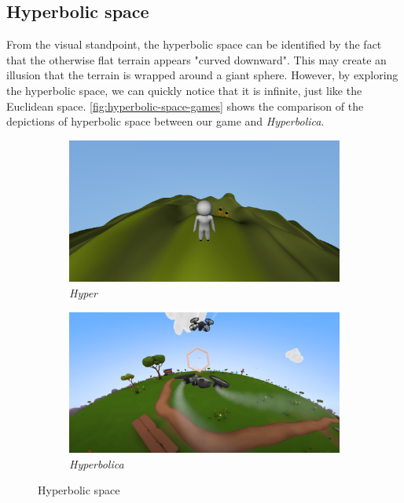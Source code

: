 \subsection{Hyperbolic space}
From the visual standpoint, the hyperbolic space can be identified by the fact that the otherwise flat terrain appears "curved downward".
This may create an illusion that the terrain is wrapped around a giant sphere.
However, by exploring the hyperbolic space, we can quickly notice that it is infinite, just like the Euclidean space.
\autoref{fig:hyperbolic-space-games} shows the comparison of the depictions of hyperbolic space between our game and \textit{Hyperbolica}.
\begin{figure}[h]
    \centering
    \begin{subfigure}[b]{0.475\textwidth}
        \centering
        \includegraphics[width=\textwidth]{chapters/results/sections/non_euclidean/resources/hyperbolic-in-hyper.png}
        \caption[]%
        {{\small \textit{Hyper}}}
        \label{fig:hyperbolic-space-games-hyper}
    \end{subfigure}
    \hfill
    \begin{subfigure}[b]{0.475\textwidth}
        \centering
        \includegraphics[width=\textwidth]{chapters/results/sections/non_euclidean/resources/hyperbolica-hyperbolic.png}
        \caption[]%
        {{\small \textit{Hyperbolica \cite{Hyperbolica-Hyperbolic}}}}
        \label{fig:hyperbolic-space-games-hyperbolica}
    \end{subfigure}
    \caption[]
    {\small Hyperbolic space}
    \label{fig:hyperbolic-space-games}
\end{figure}

